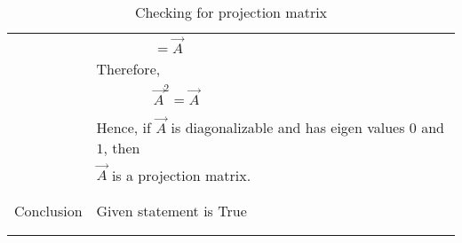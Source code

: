 \documentclass[journal,12pt]{IEEEtran}
\begin{document}
\begin{longtable}{|c|l|}
	&$\qquad\qquad=\Vec{A}$\\
	&Therefore,\\
	&$\qquad\qquad\Vec{A}^2=\Vec{A}$\\
	&\\
	&Hence, if $\vec{A}$ is diagonalizable and has eigen values $0$ and $1$, then \\
	&$\vec{A}$ is a projection matrix.\\
	&\\
	\hline
	\multirow{3}{*}{Conclusion} & \\
	& Given statement is True\\
	&\\
	\hline
	\caption{Checking for projection matrix}
    \label{table:2}
\end{longtable}
\end{document}
